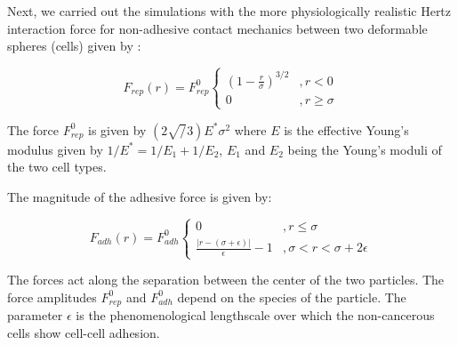 \documentclass[aps,prb,twocolumn,groupedaddress,nofootinbib,floatfix]{revtex4}
\begin{document}
Next, we carried out the simulations with the more physiologically realistic Hertz interaction force for non-adhesive contact mechanics between two deformable spheres (cells) given by \cite{}:

\begin{equation}
  F_{rep}(r) = F^0_{rep} \left\{ 
    \begin{array}{lr}
      (1-\frac{r}{\sigma})^{3/2} &, r < 0\\
      0 &, r \ge \sigma
    \end{array}
  \right.
  \label{eq:frep}
\end{equation}

The force $F^0_{rep}$ is given by $(2 \sqrt/3) E^* \sigma^2$ where $E$ is the effective Young's modulus given by $1/E^*=1/E_1 + 1/E_2$, $E_1$ and $E_2$ being the Young's moduli of the two cell types. 


The magnitude of the adhesive force is given by:

\begin{equation}
  F_{adh}(r) =F^0_{adh} \left\{
    \begin{array}{lr}
      0 &, r \le \sigma \\
      \frac{|r - (\sigma+\epsilon)|}{\epsilon}-1 &, \sigma < r < \sigma+2\epsilon
    \end{array}
  \right.
  \label{eq:fadh}
\end{equation}

The forces act along the separation between the center of the two particles. The force amplitudes  $F^0_{rep}$ and $F^0_{adh}$ depend on the species of the particle.  The parameter $\epsilon$ is the phenomenological lengthscale over which the non-cancerous cells show cell-cell adhesion. 
\end{document}
